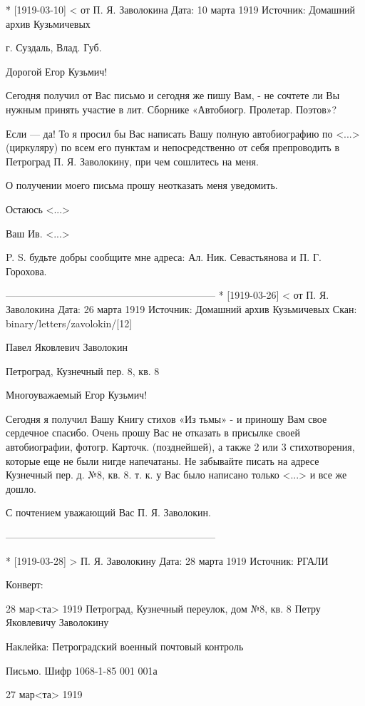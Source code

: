 \documentclass[]{memoir}
\begin{document}
* [1919-03-10] < от П. Я. Заволокина 
Дата: 10 марта 1919
Источник: Домашний архив Кузьмичевых

г. Суздаль, Влад. Губ.

Дорогой Егор Кузьмич!

Сегодня получил от Вас письмо и сегодня же пишу Вам, - не сочтете ли Вы нужным принять участие в лит. Сборнике «Автобиогр. Пролетар. Поэтов»?

Если — да! То я просил бы Вас написать Вашу полную автобиографию по <...> (циркуляру) по всем его пунктам и непосредственно от себя препроводить в Петроград П. Я. Заволокину, при чем сошлитесь на меня.

О получении моего письма прошу неотказать меня уведомить.

Остаюсь <...>

Ваш Ив. <...>

P. S. будьте добры сообщите мне адреса: Ал. Ник. Севастьянова и П. Г. Горохова.

---------------------------------------------------------------
* [1919-03-26] < от П. Я. Заволокина 
Дата: 26 марта 1919
Источник: Домашний архив Кузьмичевых
Скан: binary/letters/zavolokin/[12]

Павел Яковлевич Заволокин

Петроград, Кузнечный пер. 8, кв. 8

Многоуважаемый Егор Кузьмич!

Сегодня я получил Вашу Книгу стихов «Из тьмы» - и приношу Вам свое сердечное спасибо. Очень прошу Вас не отказать в присылке своей автобиографии, фотогр. Карточк. (позднейшей), а также 2 или 3 стихотворения, которые еще не были нигде напечатаны. Не забывайте писать на адресе Кузнечный пер. д. №8, кв. 8. т. к. у Вас было написано только <...> и все же дошло.

С почтением уважающий Вас П. Я. Заволокин. 

---------------------------------------------------------------


* [1919-03-28] > П. Я. Заволокину 
Дата: 28 марта 1919
Источник: РГАЛИ

Конверт:

28 мар<та> 1919
Петроград, Кузнечный переулок, дом №8, кв. 8
Петру Яковлевичу Заволокину

Наклейка: Петроградский военный почтовый контроль

Письмо.
Шифр 1068-1-85  001
                001а

                
27 мар<та> 1919
\end{document}
